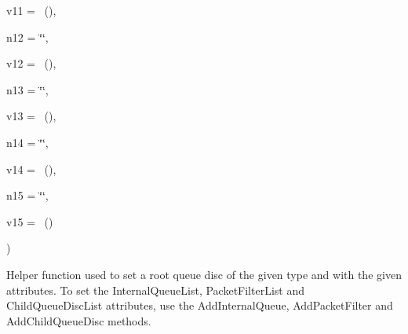 {\begin{DoxyParamCaption}
\item[{const {\bf Attribute\+Value} \&}]{v11 = {~()}, }
\item[{std\+::string}]{n12 = {\ttfamily \char`\"{}\char`\"{}}, }
\item[{const {\bf Attribute\+Value} \&}]{v12 = {~()}, }
\item[{std\+::string}]{n13 = {\ttfamily \char`\"{}\char`\"{}}, }
\item[{const {\bf Attribute\+Value} \&}]{v13 = {~()}, }
\item[{std\+::string}]{n14 = {\ttfamily \char`\"{}\char`\"{}}, }
\item[{const {\bf Attribute\+Value} \&}]{v14 = {~()}, }
\item[{std\+::string}]{n15 = {\ttfamily \char`\"{}\char`\"{}}, }
\item[{const {\bf Attribute\+Value} \&}]{v15 = {~()}}
\end{DoxyParamCaption}
)}\hypertarget{classns3_1_1TrafficControlHelper_a8588aac7a08e4dc4e7bb10fa7b9e25c8}{}\label{classns3_1_1TrafficControlHelper_a8588aac7a08e4dc4e7bb10fa7b9e25c8}
Helper function used to set a root queue disc of the given type and with the given attributes. To set the Internal\+Queue\+List, Packet\+Filter\+List and Child\+Queue\+Disc\+List attributes, use the Add\+Internal\+Queue, Add\+Packet\+Filter and Add\+Child\+Queue\+Disc methods.


